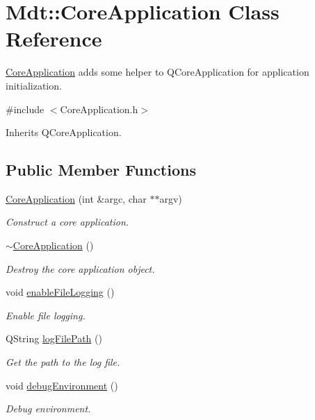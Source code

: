 \hypertarget{class_mdt_1_1_core_application}{}\section{Mdt\+:\+:Core\+Application Class Reference}
\label{class_mdt_1_1_core_application}


\hyperlink{class_mdt_1_1_core_application}{Core\+Application} adds some helper to Q\+Core\+Application for application initialization.  




{\ttfamily \#include $<$Core\+Application.\+h$>$}



Inherits Q\+Core\+Application.

\subsection*{Public Member Functions}
\begin{DoxyCompactItemize}
\item 
\hyperlink{class_mdt_1_1_core_application_a1f9e0cee5d94ec783ea49ec57030bce9}{Core\+Application} (int \&argc, char $\ast$$\ast$argv)
\begin{DoxyCompactList}\small\item\em Construct a core application. \end{DoxyCompactList}\item 
\hyperlink{class_mdt_1_1_core_application_ac91f0fe77618f10cbdf1f5594c2a82ea}{$\sim$\+Core\+Application} ()
\begin{DoxyCompactList}\small\item\em Destroy the core application object. \end{DoxyCompactList}\item 
void \hyperlink{class_mdt_1_1_core_application_aa76faa75f09c7ba30406bfd6b2284bd7}{enable\+File\+Logging} ()
\begin{DoxyCompactList}\small\item\em Enable file logging. \end{DoxyCompactList}\item 
Q\+String \hyperlink{class_mdt_1_1_core_application_a48a2915a7876c259347290f1f501df46}{log\+File\+Path} ()
\begin{DoxyCompactList}\small\item\em Get the path to the log file. \end{DoxyCompactList}\item 
void \hyperlink{class_mdt_1_1_core_application_a500820026134788b2c77c880663339d9}{debug\+Environment} ()
\begin{DoxyCompactList}\small\item\em Debug environment. \end{DoxyCompactList}\end{DoxyCompactItemize}
